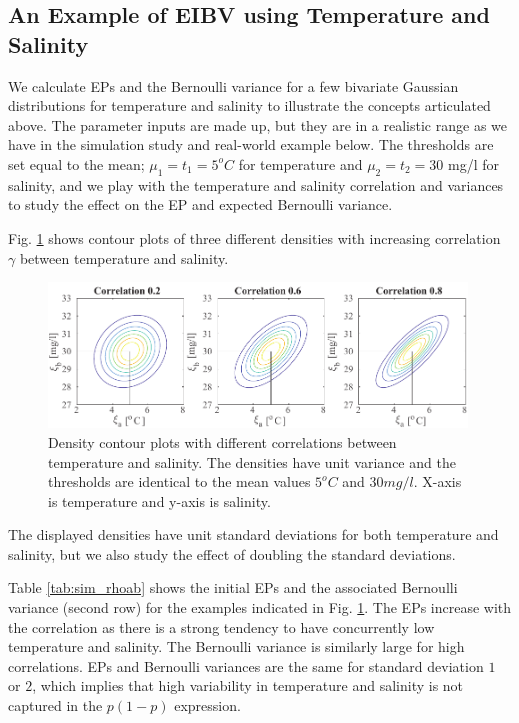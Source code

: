 \subsection{An Example of EIBV using Temperature and Salinity}
\label{Sec:UnivarEx}

We calculate EPs and the Bernoulli variance for a few bivariate
Gaussian distributions for temperature and salinity to illustrate the concepts articulated above. The parameter inputs are made up, but they are in a realistic range as we have in the simulation study and real-world example below. The thresholds are set equal to the mean; $\mu_1=t_1=5^o C$ for temperature and  $\mu_2=t_2=30$ mg/l for salinity, and we play with the temperature and salinity correlation and variances to study the effect on the EP and expected Bernoulli variance. 

Fig. \ref{illus_bivarDens} shows contour plots of three different
densities with increasing correlation $\gamma$ between temperature and
salinity. 
\begin{figure}[h!] \centering
  \includegraphics[width=0.99\textwidth]{Figures/illus_bivar.pdf}
  \caption{Density contour plots with different correlations between
    temperature and salinity. The densities have unit variance and the
    thresholds are identical to the mean values $5^o C$ and
    $30 mg/l$. X-axis is temperature and y-axis is salinity.}
\label{illus_bivarDens}
\end{figure}
The displayed densities have unit standard deviations for both
temperature and salinity, but we also study the effect of doubling the
standard deviations.

Table \ref{tab:sim_rhoab} shows the initial EPs and the associated
Bernoulli variance (second row) for the examples indicated in Fig.
\ref{illus_bivarDens}. The EPs increase with the correlation as there
is a strong tendency to have concurrently low temperature and salinity. The Bernoulli variance is similarly large for high
correlations. EPs and Bernoulli variances are the same for standard
deviation $1$ or $2$, which implies that high variability in
temperature and salinity is not captured in the $p(1-p)$ expression.

